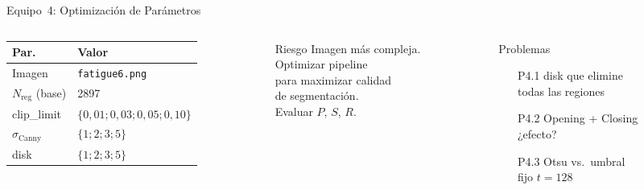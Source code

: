 \documentclass[aspectratio=169,12pt]{beamer}
\begin{document}
\begin{frame}{Equipo~4: Optimización de Parámetros}
	\begin{columns}
		\begin{column}{0.38\textwidth}
			\centering\scriptsize
			\begin{tabular}{ll}
				\toprule
				\textbf{Par.}           & \textbf{Valor}                       \\
				\midrule
				Imagen                  & \texttt{fatigue6.png}                \\
				$N_\mathrm{reg}$ (base) & 2897                                 \\
				clip\_limit             & $\{0{,}01; 0{,}03; 0{,}05; 0{,}10\}$ \\
				$\sigma_\mathrm{Canny}$ & $\{1; 2; 3; 5\}$                     \\
				disk                    & $\{1; 2; 3; 5\}$                     \\
				\bottomrule
			\end{tabular}
		\end{column}
		\begin{column}{0.28\textwidth}
			\begin{alertblock}{\scriptsize Riesgo}
				\scriptsize
				Imagen más compleja.\\
				Optimizar pipeline\\
				para maximizar calidad\\
				de segmentación.\\
				Evaluar $P$, $S$, $R$.
			\end{alertblock}
		\end{column}
		\begin{column}{0.3\textwidth}
			\begin{exampleblock}{\scriptsize Problemas}
				\scriptsize
				\begin{enumerate}
					\item[P4.1] disk que elimine\\
					      todas las regiones
					\item[P4.2] Opening + Closing\\
					      ¿efecto?
					\item[P4.3] Otsu vs.\ umbral\\
					      fijo $t=128$
				\end{enumerate}
			\end{exampleblock}
		\end{column}
	\end{columns}
\end{frame}
\end{document}

